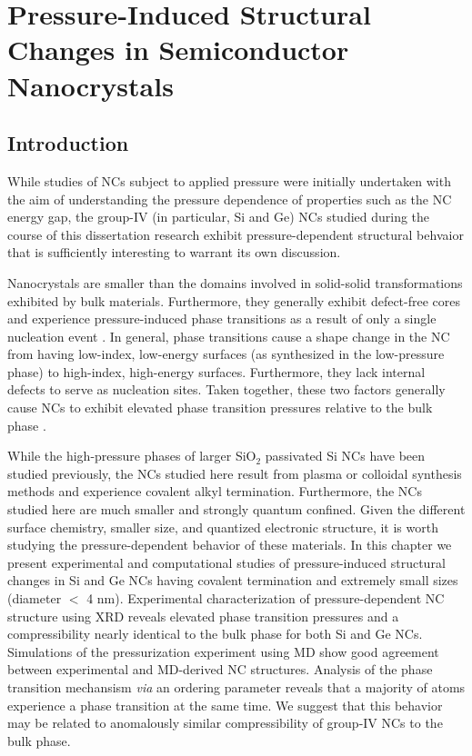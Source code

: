 \chapter{Pressure-Induced Structural Changes in Semiconductor Nanocrystals}

\section{Introduction}

While studies of NCs subject to applied pressure were initially undertaken with the aim of understanding the pressure dependence of properties such as the NC energy gap, the group-IV (in particular, Si and Ge) NCs studied during the course of this dissertation research exhibit pressure-dependent structural behvaior that is sufficiently interesting to warrant its own discussion. \par
Nanocrystals are smaller than the domains involved in solid-solid transformations exhibited by bulk materials. Furthermore, they generally exhibit defect-free cores and experience pressure-induced phase transitions as a result of only a single nucleation event \cite{PhysRevLett.76.4384}. In general, phase transitions cause a shape change in the NC from having low-index, low-energy surfaces (as synthesized in the low-pressure phase) to high-index, high-energy surfaces. Furthermore, they lack internal defects to serve as nucleation sites. Taken together, these two factors generally cause NCs to exhibit elevated phase transition pressures relative to the bulk phase \cite{PhysRevLett.76.4384, tolbert1994size}.\par
While the high-pressure phases of larger SiO$_2$ passivated Si NCs have been studied previously, the NCs studied here result from plasma or colloidal synthesis methods and experience covalent alkyl termination. Furthermore, the NCs studied here are much smaller and strongly quantum confined. Given the different surface chemistry, smaller size, and quantized electronic structure, it is worth studying the pressure-dependent behavior of these materials. In this chapter we present experimental and computational studies of pressure-induced structural changes in Si and Ge NCs having covalent termination and extremely small sizes (diameter $<$ 4 nm). Experimental characterization of pressure-dependent NC structure using XRD reveals elevated phase transition pressures and a compressibility nearly identical to the bulk phase for both Si and Ge NCs. Simulations of the pressurization experiment using MD show good agreement between experimental and MD-derived NC structures. Analysis of the phase transition mechansism \emph{via} an ordering parameter reveals that a majority of atoms experience a phase transition at the same time. We suggest that this behavior may be related to anomalously similar compressibility of group-IV NCs to the bulk phase.

